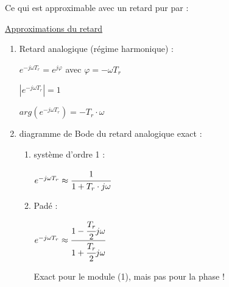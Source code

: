 \vspace{2mm}


\vspace{0.5cm}


\vspace{3mm}

Ce qui est approximable avec un retard pur par : 

\vspace{3mm}

\underline{Approximations du retard}

\begin{enumerate}
    \item Retard analogique (régime harmonique) :
    
        $e^{-j \omega T_r} = e^{j\varphi}$ avec $\varphi = - \omega T_r$

        $|e^{-j\omega T_r}| = 1$

        $arg(e^{-j\omega T_r}) = -T_r \cdot \omega$

    \item diagramme de Bode du retard analogique exact : 
        \begin{enumerate}
            \item système d'ordre 1 : 
            
                $e^{-j\omega T_r}  \approx \cfrac{1}{1+T_r\cdot j\omega}$

            \item Padé : 
                
                $e^{-j\omega T_r}  \approx \cfrac{1-\cfrac{T_r}{2}j\omega}{1+\cfrac{T_r}{2}j\omega}$

            Exact pour le module (1), mais pas pour la phase !

        \end{enumerate}
\end{enumerate}